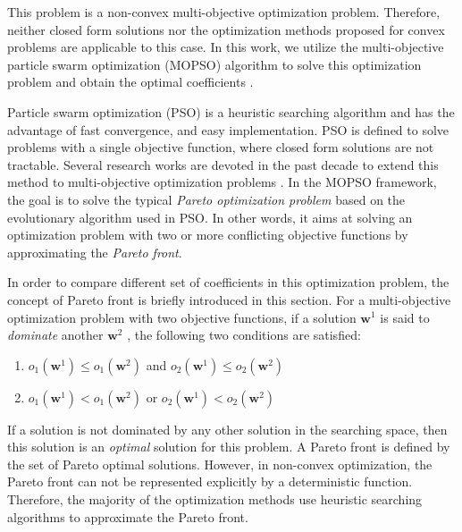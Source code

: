 This problem is a non-convex multi-objective optimization problem. Therefore, neither closed form solutions nor the optimization methods proposed for convex problems are applicable to this case. In this work, we utilize the multi-objective particle swarm optimization (MOPSO) algorithm to solve this optimization problem and obtain the optimal coefficients \cite{coello2002mopso}.

Particle swarm optimization (PSO) is a heuristic searching algorithm and has the advantage of fast convergence, and easy implementation\cite{coello2002mopso, alvarez2005mopso}. PSO is defined to solve problems with a single objective function, where closed form solutions are not tractable.  Several research works are devoted in the past decade to extend this method to multi-objective optimization problems \cite{sierra2005improving, coello2005recent}. In the MOPSO framework, the goal is to solve the typical \textit{Pareto optimization problem} based on the evolutionary algorithm used in PSO. In other words, it aims at solving an optimization problem with two or more conflicting objective functions by approximating the \textit{Pareto front}. 


In order to compare different set of coefficients in this optimization problem, the concept of Pareto front is briefly introduced in this section. For a multi-objective optimization problem with two objective functions, if a solution $\mathbf{w}^1$ is said to \textit{dominate} another $\mathbf{w}^2$ , the following two conditions are satisfied:
\begin{enumerate}
    \item $o_1(\mathbf{w}^1) \leq  o_1(\mathbf{w}^2)$ and $o_2(\mathbf{w}^1) \leq  o_2(\mathbf{w}^2)$ 
    \item $o_1(\mathbf{w}^1) <  o_1(\mathbf{w}^2)$ or $o_2(\mathbf{w}^1) < o_2(\mathbf{w}^2)$ 
\end{enumerate}

If a solution is not dominated by any other solution in the searching space, then this solution is an \textit{optimal} solution for this problem. A Pareto front is defined by the set of Pareto optimal solutions. However, in non-convex optimization, the Pareto front can not be represented explicitly by a deterministic function. Therefore, the majority of the optimization methods use heuristic searching algorithms to approximate the Pareto front\cite{coello2002mopso}.


